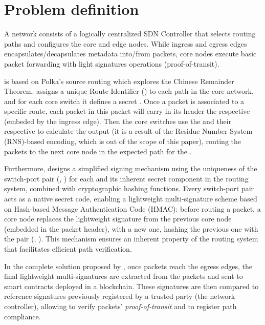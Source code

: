 \section{Problem definition} \label{sec:definition} 



A \pathsec network consists of a logically centralized SDN Controller that selects routing paths and configures the core and edge nodes. While ingress and egress edges encapsulates/decapsulates metadata into/from packets, core nodes execute basic packet forwarding with light signatures operations (proof-of-transit).

\pathsec is based on Polka's source routing which explores the Chinese Remainder Theorem\cite{polka}.
\polka assigns a unique Route Identifier (\routeid) to each path in the core network, and for each core switch it defines a secret \nodeid. Once a packet is associated to a specific route, each packet in this packet  will carry in its header the respective \routeid (embeded by the ingress edge). Then the core switches use the \routeid and their respective \nodeids to calculate the output \portid (it is a result of the Residue Number System (RNS)-based encoding\cite{pathsec}, which is out of the scope of this paper), routing the packets to the next core node in the expected path for the \routeid.

Furthermore, \pathsec designs a simplified signing mechanism using the uniqueness of the switch-port pair (\nodeid, \portid) for each \routeid and its inherent secret component in the routing system, combined with cryptographic hashing functions. Every switch-port pair acts as a native secret code, enabling a lightweight multi-signature scheme based on Hash-based Message Authentication Code (HMAC): before routing a packet, a core node replaces the lightweight signature from the previous core node (embedded in the packet header), with a new one, hashing the previous one with the pair (\nodeid, \portid). This mechanism ensures an inherent property of the routing system that facilitates efficient path verification. 

In the complete solution proposed by \pathsec, once packets reach the egress edges, the final lightweight multi-signatures are extracted from the packets and sent to smart contracts deployed in a blockchain. These signatures are then compared to reference signatures previously registered by a trusted party (the network controller), allowing to verify packets' \textit{proof-of-transit} and to register path compliance.


